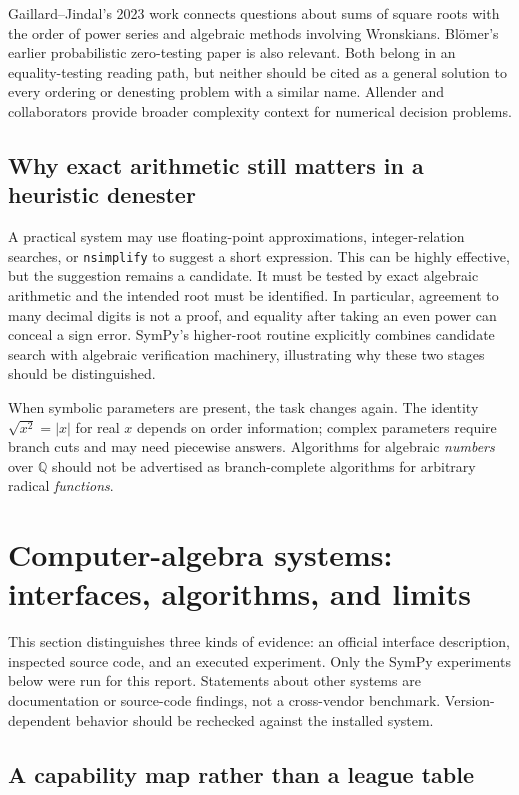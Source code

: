 \documentclass[11pt,a4paper]{article}
\newcommand{\Q}{\mathbb{Q}}
\theoremstyle{definition}
\theoremstyle{remark}
\numberwithin{equation}{section}
\begin{document}
Gaillard--Jindal's 2023 work connects questions about sums of square roots with the order of power series and algebraic methods involving Wronskians. Bl\"omer's earlier probabilistic zero-testing paper is also relevant. Both belong in an equality-testing reading path, but neither should be cited as a general solution to every ordering or denesting problem with a similar name. Allender and collaborators provide broader complexity context for numerical decision problems.\cite{gaillard,blomerzero,allender}

\subsection{Why exact arithmetic still matters in a heuristic denester}

A practical system may use floating-point approximations, integer-relation searches, or \texttt{nsimplify} to suggest a short expression. This can be highly effective, but the suggestion remains a candidate. It must be tested by exact algebraic arithmetic and the intended root must be identified. In particular, agreement to many decimal digits is not a proof, and equality after taking an even power can conceal a sign error. SymPy's higher-root routine explicitly combines candidate search with algebraic verification machinery, illustrating why these two stages should be distinguished.\cite{sympydocs}

When symbolic parameters are present, the task changes again. The identity $\sqrt{x^2}=|x|$ for real $x$ depends on order information; complex parameters require branch cuts and may need piecewise answers. Algorithms for algebraic \emph{numbers} over $\Q$ should not be advertised as branch-complete algorithms for arbitrary radical \emph{functions}.

\section{Computer-algebra systems: interfaces, algorithms, and limits}
\label{sec:cas}

This section distinguishes three kinds of evidence: an official interface description, inspected source code, and an executed experiment. Only the SymPy experiments below were run for this report. Statements about other systems are documentation or source-code findings, not a cross-vendor benchmark. Version-dependent behavior should be rechecked against the installed system.

\subsection{A capability map rather than a league table}
\end{document}
